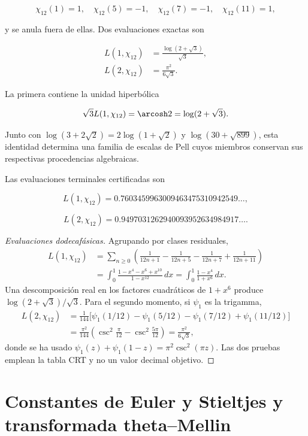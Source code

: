 \[
\chi_{12}(1)=1,\quad
\chi_{12}(5)=-1,\quad
\chi_{12}(7)=-1,\quad
\chi_{12}(11)=1,
\]

y se anula fuera de ellas. Dos evaluaciones exactas son

\begin{align}
L(1,\chi_{12})&=\frac{\log(2+\sqrt3)}{\sqrt3},
\label{eq:L1chi12}\\
L(2,\chi_{12})&=\frac{\pi^2}{6\sqrt3}.
\label{eq:L2chi12}
\end{align}

La primera contiene la unidad hiperb\'olica

\begin{equation}
\sqrt3L(1,\chi_{12})=\arcosh2=\log(2+\sqrt3).
\label{eq:pell2}
\end{equation}

Junto con \(\log(3+2\sqrt2)=2\log(1+\sqrt2)\) y
\(\log(30+\sqrt{899})\), esta identidad determina una familia de escalas
de Pell cuyos miembros conservan sus respectivas procedencias algebraicas.

Las evaluaciones terminales certificadas son

\[
L(1,\chi_{12})=0.7603459963009463475310942549\ldots,
\]

\[
L(2,\chi_{12})=0.9497031262940093952634984917\ldots.
\]

\begin{proof}[Evaluaciones dodecaf\'asicas]
Agrupando por clases residuales,
\begin{align*}
L(1,\chi_{12})
&=\sum_{n\ge0}\left(
\frac1{12n+1}-\frac1{12n+5}
-\frac1{12n+7}+\frac1{12n+11}\right)\\
&=\int_0^1
\frac{1-x^4-x^6+x^{10}}{1-x^{12}}\,dx
=\int_0^1\frac{1-x^4}{1+x^6}\,dx.
\end{align*}
Una descomposici\'on real en los factores cuadr\'aticos de \(1+x^6\)
produce
\(\log(2+\sqrt3)/\sqrt3\). Para el segundo momento, si
\(\psi_1\) es la trigamma,
\begin{align*}
L(2,\chi_{12})
&=\frac1{144}\bigl[
\psi_1(1/12)-\psi_1(5/12)
-\psi_1(7/12)+\psi_1(11/12)\bigr]\\
&=\frac{\pi^2}{144}\left(
\csc^2\frac\pi{12}-\csc^2\frac{5\pi}{12}\right)
=\frac{\pi^2}{6\sqrt3},
\end{align*}
donde se ha usado
\(\psi_1(z)+\psi_1(1-z)=\pi^2\csc^2(\pi z)\). Las dos pruebas emplean
la tabla CRT y no un valor decimal objetivo.
\end{proof}

\section{Constantes de Euler y Stieltjes y transformada theta--Mellin}

